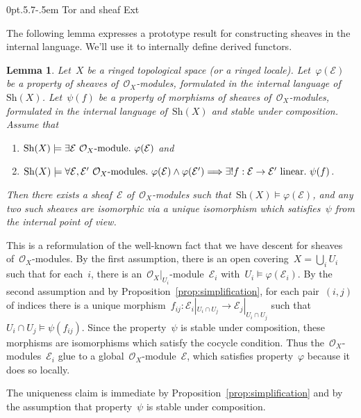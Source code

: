 \documentclass[10pt,reqno,a4paper]{amsbook}
\makeatletter
\theoremstyle{definition}
\theoremstyle{plain}
\newtheorem{lemma}[defn]{Lemma}
\theoremstyle{remark}
\newcommand{\E}{\mathcal{E}}
\renewcommand{\O}{\mathcal{O}}
\newcommand{\Sh}{\mathrm{Sh}}
\newcommand{\?}{\,{:}\,}
\renewcommand{\_}{\mathpunct{.}\,}
\renewenvironment{proof}[1][\proofname]{\par
  \pushQED{\qed}%
  \normalfont \topsep6\p@\@plus6\p@\relax
  \trivlist
  \item[\hskip\labelsep
        \itshape
    #1\@addpunct{.}]\ignorespaces
}{%
  \popQED\endtrivlist\@endpefalse
}
\def\subsection{\@startsection{subsection}{2}%
  {0pt}{.5\linespacing\@plus.7\linespacing}{-.5em}%
  {\normalfont\bfseries}}
\makeatother
\begin{document}
\subsection{Tor and sheaf Ext}
\label{sect:sheaf-ext-and-tor}

The following lemma expresses a prototype result for constructing sheaves in
the internal language. We'll use it to internally define derived functors.

\begin{lemma}\label{lemma:descent-for-modules}
Let~$X$ be a ringed topological space (or a ringed locale).
Let~$\varphi(\E)$ be a property of sheaves of~$\O_X$-modules, formulated in the internal
language of~$\Sh(X)$. Let~$\psi(f)$ be a property of morphisms
of sheaves of~$\O_X$-modules, formulated in the internal
language of~$\Sh(X)$ and stable under composition. Assume that
\begin{enumerate}
\item $\Sh(X) \models \exists \textnormal{$\E$ $\O_X$-module}\_ \varphi(\E)$
and
\item $\Sh(X) \models \forall \textnormal{$\E,\E'$ $\O_X$-modules}\_ \varphi(\E) \wedge \varphi(\E')
  \Longrightarrow
  \exists! \textnormal{$f : \E \to \E'$ linear}\_ \psi(f)$.
\end{enumerate}
Then there exists a sheaf~$\E$ of~$\O_X$-modules such that~$\Sh(X) \models \varphi(\E)$,
and any two such sheaves are isomorphic via a unique isomorphism which
satisfies~$\psi$ from the internal point of view.
\end{lemma}

\begin{proof}This is a reformulation of the well-known fact that we have
descent for sheaves of~$\O_X$-modules. By the first assumption, there is an
open covering~$X = \bigcup_i U_i$ such that for each~$i$, there is
an~$\O_X|_{U_i}$-module~$\E_i$ with~$U_i \models \varphi(\E_i)$. By the second
assumption and by Proposition~\ref{prop:simplification}, for each pair~$(i,j)$
of indices there is a unique morphism~$f_{ij} : \E_i|_{U_i \cap U_j} \to
\E_j|_{U_i \cap U_j}$ such that~$U_i \cap U_j \models \psi(f_{ij})$. Since the
property~$\psi$ is stable under composition, these morphisms are isomorphisms
which satisfy the cocycle condition. Thus the~$\O_X$-modules~$\E_i$ glue to a
global~$\O_X$-module~$\E$, which satisfies property~$\varphi$ because it does
so locally.

The uniqueness claim is immediate by Proposition~\ref{prop:simplification} and
by the assumption that property~$\psi$ is stable under composition.
\end{proof}
\end{document}
